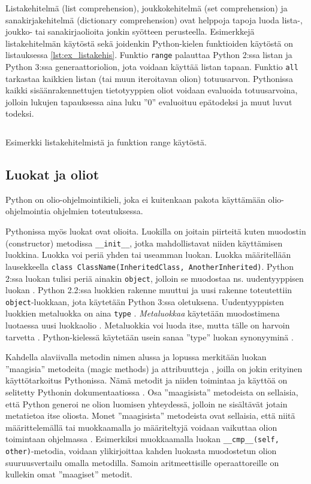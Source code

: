 \documentclass[finnish]{tktltiki2}
\theoremstyle{definition}
\theoremstyle{remark}
\begin{document}
Listakehitelmä (list comprehension), joukkokehitelmä (set comprehension) ja sanakirjakehitelmä (dictionary comprehension) ovat helppoja tapoja luoda lista-, joukko- tai sanakirjaolioita jonkin syötteen perusteella. Esimerkkejä listakehitelmän käytöstä sekä joidenkin Python-kielen funktioiden käytöstä on listauksessa \ref{lst:ex_listakehis}. Funktio \verb|range| palauttaa Python 2:ssa listan ja Python 3:ssa generaattoriolion, jota voidaan käyttää listan tapaan. Funktio \verb|all| tarkastaa kaikkien listan (tai muun iteroitavan olion) totuusarvon. Pythonissa kaikki sisäänrakennettujen tietotyyppien oliot voidaan evaluoida totuusarvoina, jolloin lukujen tapauksessa aina luku ''0'' evaluoituu epätodeksi ja muut luvut todeksi.

\begin{listing}
    \inputminted[linenos]{python}{code/luvut.py}
    \caption{Esimerkki listakehitelmistä ja funktion range käytöstä.}
    \label{lst:ex_listakehis}
\end{listing}


\subsection{Luokat ja oliot}

Python on olio-ohjelmointikieli, joka ei kuitenkaan pakota käyttämään olio-ohjelmointia ohjelmien toteutuksessa. 

Pythonissa myös luokat ovat olioita. Luokilla on joitain piirteitä kuten muodostin (constructor) metodissa \verb|__init__|, jotka mahdollistavat niiden käyttämisen luokkina. Luokka voi periä yhden tai useamman luokan. Luokka määritellään lausekkeella \lstinline|class ClassName(InheritedClass, AnotherInherited)|. Python 2:ssa luokan tulisi periä ainakin \verb|object|, jolloin se muodostaa ns. uudentyyppisen luokan \cite{martelli2006python}. Python 2.2:ssa luokkien rakenne muuttui ja uusi rakenne toteutettiin \verb|object|-luokkaan, jota käytetään Python 3:ssa oletuksena. Uudentyyppisten luokkien metaluokka on aina \verb|type| \cite{martelli2006python}. \emph{Metaluokkaa} käytetään muodostimena luotaessa uusi luokkaolio \cite{MetaprogP3}. Metaluokkia voi luoda itse, mutta tälle on harvoin tarvetta \cite{MetaprogP3}. Python-kielessä käytetään usein sanaa ''type'' luokan synonyyminä \cite{MetaprogP3}.

Kahdella alaviivalla metodin nimen alussa ja lopussa merkitään luokan ''maagisia'' metodeita (magic methods) ja attribuutteja \cite{martelli2006python}, joilla on jokin erityinen käyttötarkoitus Pythonissa. Nämä metodit ja niiden toimintaa ja käyttöä on selitetty Pythonin dokumentaatiossa \cite{magic-methods}. Osa ''maagisista'' metodeista on sellaisia, että Python generoi ne olion luomisen yhteydessä, jolloin ne sisältävät jotain metatietoa itse oliosta. Monet ''maagisista'' metodeista ovat sellaisia, että niitä määrittelemällä tai muokkaamalla jo määriteltyjä voidaan vaikuttaa olion toimintaan ohjelmassa \cite{magic-methods}. Esimerkiksi muokkaamalla luokan \verb|__cmp__(self, other)|-metodia, voidaan ylikirjoittaa kahden luokasta muodostetun olion suuruusvertailu omalla metodilla. Samoin aritmeettisille operaattoreille on kullekin omat ''maagiset'' metodit. 
\end{document}
